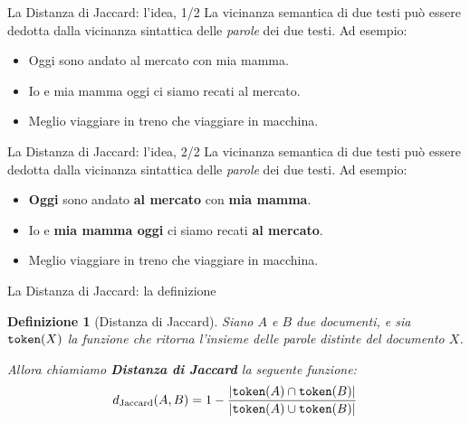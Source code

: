 \documentclass[12pt]{beamer}
\newtheorem{definizione}{Definizione}
\begin{document}
  \begin{frame}{La Distanza di Jaccard: l'idea, 1/2}
    La vicinanza semantica di due testi può essere dedotta dalla vicinanza
    sintattica delle \emph{parole} dei due testi. Ad esempio:

    \vspace{0.25cm}

    \begin{itemize}
      \item Oggi sono andato al mercato con mia mamma.
      \item Io e mia mamma oggi ci siamo recati al mercato.
      \item Meglio viaggiare in treno che viaggiare in macchina.
    \end{itemize}
  \end{frame}

  \begin{frame}{La Distanza di Jaccard: l'idea, 2/2}
    La vicinanza semantica di due testi può essere dedotta dalla vicinanza
    sintattica delle \emph{parole} dei due testi. Ad esempio:

    \vspace{0.25cm}

    \begin{itemize}
      \item \textbf{Oggi} sono andato \textbf{al mercato} con \textbf{mia mamma}.
      \item Io e \textbf{mia mamma oggi} ci siamo recati \textbf{al mercato}.
      \item Meglio viaggiare in treno che viaggiare in macchina.
    \end{itemize}
  \end{frame}

  \begin{frame}{La Distanza di Jaccard: la definizione}
    \begin{definizione}[Distanza di Jaccard]
      Siano \(A\) e \(B\) due documenti, e sia \(\text{\texttt{token}}(X)\) la
      funzione che ritorna l'insieme delle parole distinte del documento \(X\).

      \vspace{0.25cm}

      Allora chiamiamo \textbf{Distanza di Jaccard} la seguente funzione:
      \[
        d_{\text{Jaccard}}(A, B) = 1 - \frac
          {\left|\text{\texttt{token}}(A)\cap\text{\texttt{token}}(B)\right|}
          {\left|\text{\texttt{token}}(A)\cup\text{\texttt{token}}(B)\right|}
      \]
    \end{definizione}
  \end{frame}
\end{document}
